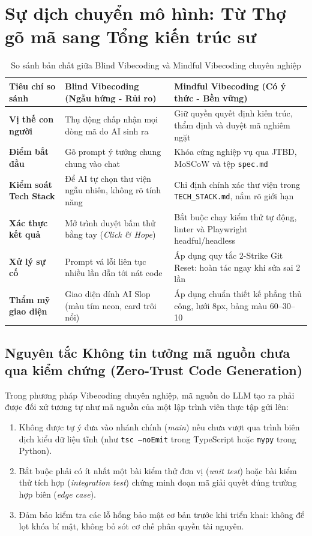 \documentclass[a4paper,11pt]{article}
\begin{document}
\section{Sự dịch chuyển mô hình: Từ Thợ gõ mã sang Tổng kiến trúc sư}

\begin{table}[htbp]
\centering
\small
\caption{So sánh bản chất giữa Blind Vibecoding và Mindful Vibecoding chuyên nghiệp}
\vspace{0.5em}
\begin{tabularx}{\textwidth}{L{3.2cm} L{5.5cm} Y}
\toprule
\textbf{Tiêu chí so sánh} & \textbf{Blind Vibecoding (Ngẫu hứng - Rủi ro)} & \textbf{Mindful Vibecoding (Có ý thức - Bền vững)} \\
\midrule
\textbf{Vị thế con người} & Thụ động chấp nhận mọi dòng mã do AI sinh ra & Giữ quyền quyết định kiến trúc, thẩm định và duyệt mã nghiêm ngặt \\
\textbf{Điểm bắt đầu} & Gõ prompt ý tưởng chung chung vào chat & Khóa cứng nghiệp vụ qua JTBD, MoSCoW và tệp \texttt{spec.md} \\
\textbf{Kiểm soát Tech Stack} & Để AI tự chọn thư viện ngẫu nhiên, không rõ tính năng & Chỉ định chính xác thư viện trong \texttt{TECH\_STACK.md}, nắm rõ giới hạn \\
\textbf{Xác thực kết quả} & Mở trình duyệt bấm thử bằng tay (\textit{Click \& Hope}) & Bắt buộc chạy kiểm thử tự động, linter và Playwright headful/headless \\
\textbf{Xử lý sự cố} & Prompt vá lỗi liên tục nhiều lần dẫn tới nát code & Áp dụng quy tắc 2-Strike Git Reset: hoàn tác ngay khi sửa sai 2 lần \\
\textbf{Thẩm mỹ giao diện} & Giao diện dính AI Slop (màu tím neon, card trôi nổi) & Áp dụng chuẩn thiết kế phẳng thủ công, lưới 8px, bảng màu 60--30--10 \\
\bottomrule
\end{tabularx}
\end{table}

\subsection{Nguyên tắc Không tin tưởng mã nguồn chưa qua kiểm chứng (Zero-Trust Code Generation)}
Trong phương pháp Vibecoding chuyên nghiệp, mã nguồn do LLM tạo ra phải được đối xử tương tự như mã nguồn của một lập trình viên thực tập gửi lên:
\begin{enumerate}[label={\arabic*.}]
    \item Không được tự ý đưa vào nhánh chính (\textit{main}) nếu chưa vượt qua trình biên dịch kiểu dữ liệu tĩnh (như \texttt{tsc --noEmit} trong TypeScript hoặc \texttt{mypy} trong Python).
    \item Bắt buộc phải có ít nhất một bài kiểm thử đơn vị (\textit{unit test}) hoặc bài kiểm thử tích hợp (\textit{integration test}) chứng minh đoạn mã giải quyết đúng trường hợp biên (\textit{edge case}).
    \item Đảm bảo kiểm tra các lỗ hổng bảo mật cơ bản trước khi triển khai: không để lọt khóa bí mật, không bỏ sót cơ chế phân quyền tài nguyên.
\end{enumerate}
\end{document}

